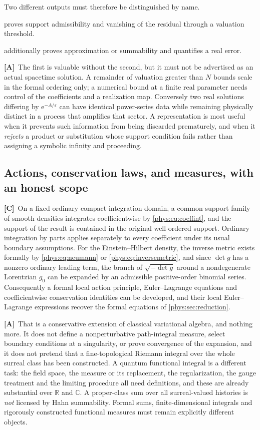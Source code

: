 \documentclass[11pt,letterpaper]{article}
\numberwithin{equation}{section}
\theoremstyle{definition}
\theoremstyle{remark}
\newcommand{\R}{\mathbb R}
\newcommand{\C}{\mathbb C}
\newcommand{\eps}{\varepsilon}
\newcommand{\ee}{\mathrm e}
\newcommand{\TC}{\textcolor{TierC}{\textsf{\bfseries[C]}}}
\newcommand{\TA}{\textcolor{TierA}{\textsf{\bfseries[A]}}}
\begin{document}
Two different outputs must therefore be distinguished by name.
\begin{description}[style=nextline,leftmargin=0pt,labelsep=0pt]
\item[A formal certificate]
proves support admissibility and vanishing of the residual through a valuation
threshold.
\item[An analytic certificate]
additionally proves approximation or summability and quantifies a real error.
\end{description}
\TA\ The first is valuable without the second, but it must not be advertised as
an actual spacetime solution. A remainder of valuation greater than $N$ bounds
scale in the formal ordering only; a numerical bound at a finite real parameter
needs control of the coefficients and a realization map. Conversely two real
solutions differing by $\ee^{-A/\eps}$ can have identical power-series data
while remaining physically distinct in a process that amplifies that sector.
A representation is most useful when it prevents such information from being
discarded prematurely, and when it \emph{rejects} a product or substitution
whose support condition fails rather than assigning a symbolic infinity and
proceeding.

\subsection{Actions, conservation laws, and measures, with an honest scope}
\label{phys:sub:actions}

\TC\ On a fixed ordinary compact integration domain, a common-support family of
smooth densities integrates coefficientwise by \eqref{phys:eq:coeffint}, and
the support of the result is contained in the original well-ordered support.
Ordinary integration by parts applies separately to every coefficient under its
usual boundary assumptions. For the Einstein--Hilbert density, the inverse
metric exists formally by \eqref{phys:eq:neumann} or
\eqref{phys:eq:inversemetric}, and since $\det g$ has a nonzero ordinary
leading term, the branch of $\sqrt{-\det g}$ around a nondegenerate Lorentzian
$g_{0}$ can be expanded by an admissible positive-order binomial series.
Consequently a formal local action principle, Euler--Lagrange equations and
coefficientwise conservation identities can be developed, and their local
Euler--Lagrange expressions recover the formal equations of
\cref{phys:sec:reduction}.

\TA\ That is a conservative extension of classical variational algebra, and
nothing more. It does not define a nonperturbative path-integral measure,
select boundary conditions at a singularity, or prove convergence of the
expansion, and it does not pretend that a fine-topological Riemann integral
over the whole surreal class has been constructed. A quantum functional
integral is a different task: the field space, the measure or its replacement,
the regularization, the gauge treatment and the limiting procedure all need
definitions, and these are already substantial over $\R$ and $\C$. A
proper-class sum over all surreal-valued histories is \emph{not} licensed by
Hahn summability. Formal sums, finite-dimensional integrals and rigorously
constructed functional measures must remain explicitly different objects.
\end{document}
